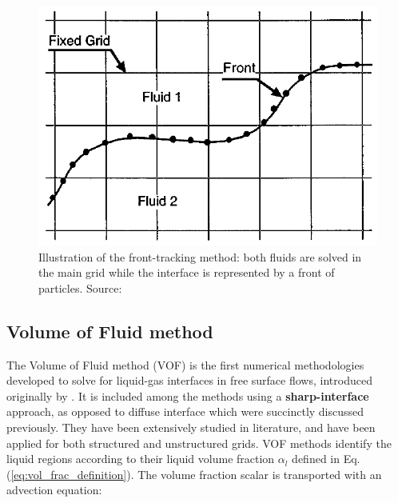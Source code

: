 \begin{figure}[h!]
	\centering
	\includegraphics[scale=0.5]{./part1_numerical_approaches/figures_ch2/front-tracking_triggvason}
	\caption[Illustration of the front-tracking method]{Illustration of the front-tracking method: both fluids are solved in the main grid while the interface is represented by a front of particles. Source: }
	\label{fig:front_tracking_tryggvason}
\end{figure}



\subsection{Volume of Fluid method}
\label{subsec:ch2_VOF}


The Volume of Fluid method (VOF) is the first numerical methodologies developed to solve for liquid-gas interfaces in free surface flows, introduced originally by . It is included among the methods using a \textbf{sharp-interface} approach, as opposed to diffuse interface which were succinctly discussed previously. They have been extensively studied in literature, and have been applied for both structured  and unstructured  grids. VOF methods identify the liquid regions according to their liquid volume fraction $\alpha_l$ defined in Eq. (\ref{eq:vol_frac_definition}). The volume fraction scalar is transported with an advection equation:

